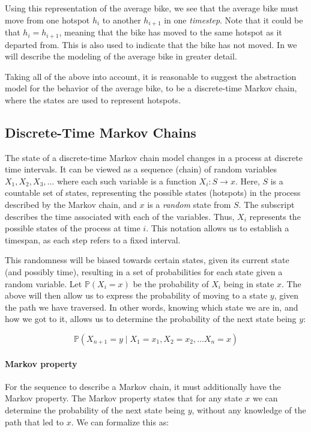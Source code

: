 Using this representation of the average bike, we see that the average bike must move from one hotspot $h_i$ to another $h_{i+1}$ in one \emph{timestep}.
Note that it could be that $h_i = h_{i+1}$, meaning that the bike has moved to the same hotspot as it departed from.
This is also used to indicate that the bike has not moved.
In  we will describe the modeling of the average bike in greater detail.

Taking all of the above into account, it is reasonable to suggest the abstraction model for the behavior of the average bike, to be a discrete-time Markov chain, where the states are used to represent hotspots.

\subsection{Discrete-Time Markov Chains}\label{markov}
The state of a discrete-time Markov chain model changes in a process at discrete time intervals.
It can be viewed as a sequence (chain) of random variables $X_1, X_2, X_3, \dots$ where each such variable is a function $X_i:S \rightarrow x$.
Here, $S$ is a countable set of states, representing the possible states (hotspots) in the process described by the Markov chain, and $x$ is a \textit{random} state from $S$.
The subscript describes the time associated with each of the variables.
Thus, $X_i$ represents the possible states of the process at time $i$.
This notation allows us to establish a timespan, as each step refers to a fixed interval.

This randomness will be biased towards certain states, given its current state (and possibly time), resulting in a set of probabilities for each state given a random variable.
Let $\mathbb{P}(X_i = x)$ be the probability of $X_i$ being in state $x$.
The above will then allow us to express the probability of moving to a state $y$, given the path we have traversed.
In other words, knowing which state we are in, and how we got to it, allows us to determine the probability of the next state being $y$:

$$\mathbb{P}(X_{n+1} = y \mid X_1 = x_1, X_2 = x_2, \dots X_n = x)$$

\paragraph{Markov property}\label{markov:property}
For the sequence to describe a Markov chain, it must additionally have the Markov property.
The Markov property states that for any state $x$ we can determine the probability of the next state being $y$, without any knowledge of the path that led to $x$.
We can formalize this as:

